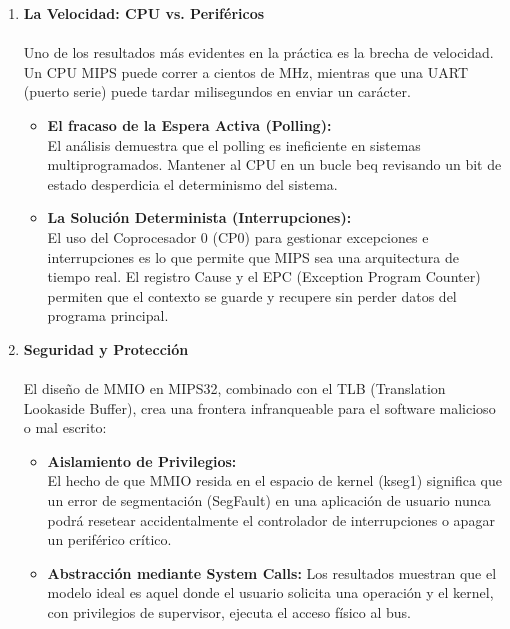 \documentclass[]{article}
\begin{document}
\begin{enumerate}
\begin{itemize}
				\item \textbf{Carga de Trabajo del Compilador:}\\ Al no haber instrucciones IN/OUT, esto optimiza el código generado, permitiendo que el optimizador de registros del compilador trabaje con datos de E/S como si fueran variables locales.
			\end{itemize}
		\item \textbf{La Velocidad: CPU vs. Periféricos}\\\\
			Uno de los resultados más evidentes en la práctica es la brecha de velocidad. Un CPU MIPS puede correr a cientos de MHz, mientras que una UART (puerto serie) puede tardar milisegundos en enviar un carácter.
			\begin{itemize}
				\item \textbf{El fracaso de la Espera Activa (Polling):}\\ El análisis demuestra que el polling es ineficiente en sistemas multiprogramados. Mantener al CPU en un bucle beq revisando un bit de estado desperdicia el determinismo del sistema.
				\item \textbf{La Solución Determinista (Interrupciones):}\\ El uso del Coprocesador 0 (CP0) para gestionar excepciones e interrupciones es lo que permite que MIPS sea una arquitectura de tiempo real. El registro Cause y el EPC (Exception Program Counter) permiten que el contexto se guarde y recupere sin perder datos del programa principal.
			\end{itemize}
			
		\item \textbf{Seguridad y Protección}\\\\
			El diseño de MMIO en MIPS32, combinado con el TLB (Translation Lookaside Buffer), crea una frontera infranqueable para el software malicioso o mal escrito:
			\begin{itemize}
				\item \textbf{Aislamiento de Privilegios:}\\ El hecho de que MMIO resida en el espacio de kernel (kseg1) significa que un error de segmentación (SegFault) en una aplicación de usuario nunca podrá resetear accidentalmente el controlador de interrupciones o apagar un periférico crítico.
				\item \textbf{Abstracción mediante System Calls:} Los resultados muestran que el modelo ideal es aquel donde el usuario solicita una operación y el kernel, con privilegios de supervisor, ejecuta el acceso físico al bus.
			\end{itemize}
	\end{enumerate}
	
	
	
\end{document}
